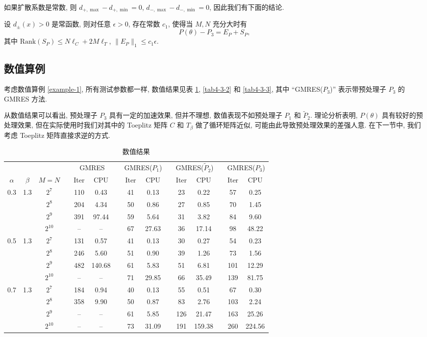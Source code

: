 \documentclass{ecnumaster}
\begin{document}
如果扩散系数是常数, 则 $d_{+,\max}-d_{+,\min}=0$, $d_{-,\max}-d_{-,\min}=0$,
因此我们有下面的结论.
\begin{corollary} 
  设 $d_{\pm}(x)>0$ 是常函数, 则对任意 $\epsilon>0$, 存在常数 $c_1$, 使得当 $M,N$ 充分大时有
  $$ P(\theta) - P_3 = E_P + S_P,$$
  其中 $\mathrm{Rank}(S_P)\leq N\ell_C + 2M\ell_T$,
  $ \|E_P\|_1 \leq c_1 \epsilon. $
\end{corollary}


\subsection{数值算例}

考虑数值算例 \ref{example-1},
所有测试参数都一样, 数值结果见表 \ref{tab4-3-1}, \ref{tab4-3-2} 和 \ref{tab4-3-3},
其中 “GMRES($P_3$)” 表示带预处理子 $P_3$ 的 GMRES 方法.

从数值结果可以看出, 预处理子 $P_3$ 具有一定的加速效果, 但并不理想,
数值表现不如预处理子 $P_1$ 和 $\tilde{P}_2$.
理论分析表明, $P(\theta)$ 具有较好的预处理效果, 
但在实际使用时我们对其中的 Toeplitz 矩阵 $C$ 和 $T_\beta$ 做了循环矩阵近似,
可能由此导致预处理效果的差强人意.
在下一节中, 我们考虑 Toeplitz 矩阵直接求逆的方式.  

\begin{table}[H]
\centering
\caption{数值结果} \label{tab4-3-1}
\begin{tabular}{ccccccccccccccc} \toprule
& &  && \multicolumn{2}{c}{GMRES} && \multicolumn{2}{c}{GMRES($P_1$)}
&& \multicolumn{2}{c}{GMRES($\tilde{P}_2$)}
&& \multicolumn{2}{c}{GMRES($P_3$)} \\
$\alpha$ & $\beta$ & $M = N$ && Iter & CPU && Iter & CPU
&& Iter & CPU && Iter & CPU \\ \midrule
0.3 & 1.3
 & $2^7$    && 110 & 0.43   && 41 & 0.13  && 23  & 0.22  && 57 & 0.25    \\
&& $2^8$    && 204 & 4.34   && 50 & 0.86  && 27  & 0.85  && 70 & 1.45    \\
&& $2^9$    && 391 & 97.44  && 59 & 5.64  && 31  & 3.82  && 84 & 9.60    \\
&& $2^{10}$ && --  & --     && 67 & 27.63 && 36  & 17.14 && 98 & 48.22    \\  \midrule
0.5 & 1.3
 & $2^7$    && 131 & 0.57   && 41 & 0.13  && 30  & 0.27  && 54 & 0.23     \\
&& $2^8$    && 246 & 5.60   && 51 & 0.90  && 39  & 1.26  && 73 & 1.56     \\
&& $2^9$    && 482 & 140.68 && 61 & 5.83  && 51  & 6.81  && 101& 12.29    \\
&& $2^{10}$ && --  & --     && 71 & 29.85 && 66  & 35.49 && 139& 81.75    \\ \midrule
0.7 & 1.3
 & $2^7$    && 184 & 0.94   && 40 & 0.13  && 55  & 0.51  && 67 & 0.30     \\
&& $2^8$    && 358 & 9.90   && 50 & 0.87  && 83  & 2.76  && 103 & 2.24    \\
&& $2^9$    && --  & --     && 61 & 5.85  && 126 & 21.47 && 163 & 25.26   \\
&& $2^{10}$ && --  & --     && 73 &31.09  && 191 & 159.38&& 260 & 224.56  \\ \bottomrule
\end{tabular}
\end{table}
\end{document}
